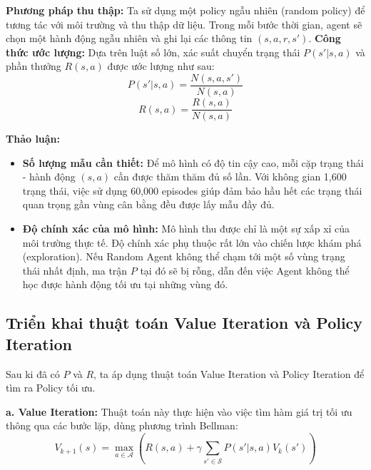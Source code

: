 \textbf{Phương pháp thu thập:} 
Ta sử dụng một policy ngẫu nhiên (random policy) để tương tác với môi trường và thu thập dữ liệu. Trong mỗi bước thời gian, agent sẽ chọn một hành động ngẫu nhiên và ghi lại các thông tin $(s, a, r, s')$.
\textbf{Công thức ước lượng:}
Dựa trên luật số lớn, xác suất chuyển trạng thái $P(s'|s, a)$ và phần thưởng $R(s, a)$ được ước lượng như sau:
\begin{equation}
P(s'|s, a) = \frac{N(s, a, s')}{N(s, a)}
\end{equation}
\begin{equation}
R(s, a) = \frac{R(s, a)}{N(s, a)}
\end{equation}

\textbf{Thảo luận:}
\begin{itemize}
    \item \textbf{Số lượng mẫu cần thiết:} Để mô hình có độ tin cậy cao, mỗi cặp trạng thái - hành động $(s, a)$ cần được thăm thăm đủ số lần. Với không gian 1,600 trạng thái, việc sử dụng 60,000 episodes giúp đảm bảo hầu hết các trạng thái quan trọng gần vùng cân bằng đều được lấy mẫu đầy đủ.
    \item \textbf{Độ chính xác của mô hình:} Mô hình thu được chỉ là một sự xấp xỉ của môi trường thực tế. Độ chính xác phụ thuộc rất lớn vào chiến lược khám phá (exploration). Nếu Random Agent không thể chạm tới một số vùng trạng thái nhất định, ma trận $P$ tại đó sẽ bị rỗng, dẫn đến việc Agent không thể học được hành động tối ưu tại những vùng đó.
\end{itemize}

\subsection{Triển khai thuật toán Value Iteration và Policy Iteration}
Sau ki đã có $P$ và $R$, ta áp dụng thuật toán Value Iteration và Policy Iteration để tìm ra Policy tối ưu.

\textbf{a. Value Iteration:}
Thuật toán này thực hiện vào việc tìm hàm giá trị tối ưu thông qua các bước lặp, dùng phương trình Bellman:
\begin{equation} 
    V_{k+1}(s) = \max_{a \in \mathcal{A}} \left( R(s, a) + \gamma \sum_{s' \in \mathcal{S}} P(s'|s,a) V_k(s') \right) 
\end{equation} 


